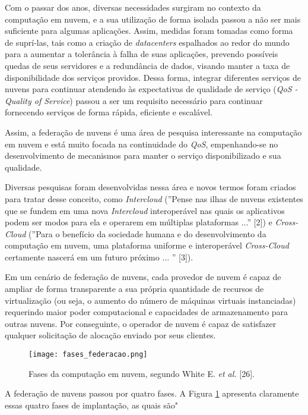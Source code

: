 Com o passar dos anos, diversas necessidades surgiram no contexto da computação em nuvem, e a sua utilização de forma isolada passou a não ser mais suficiente para algumas aplicações. Assim, medidas foram tomadas como forma de suprí-las, tais como a criação de \textit{datacenters} espalhados ao redor do mundo para a aumentar a tolerância à falha de suas aplicações, prevendo possíveis quedas de seus servidores e a redundância de dados, visando manter a taxa de disponibilidade dos serviços providos. Dessa forma, integrar diferentes serviços de nuvens para continuar atendendo às expectativas de qualidade de serviço (\textit{QoS - Quality of Service}) passou a ser um requisito necessário para continuar fornecendo serviços de forma rápida, eficiente e escalável. 

Assim, a federação de nuvens é uma área de pesquisa interessante na computação em nuvem e está muito focada na continuidade do \textit{QoS}, empenhando-se no desenvolvimento de mecanismos para manter o serviço disponibilizado e sua qualidade. 

Diversas pesquisas foram desenvolvidas nessa área e novos termos foram criados para tratar desse conceito, como \textit{Intercloud} (''Pense nas ilhas de nuvens existentes que se fundem em uma nova \textit{Intercloud} interoperável nas quais os aplicativos podem ser modos para ela e operarem em múltiplas plataformas ...'' [2]) e \textit{Cross-Cloud} (''Para o benefício da sociedade humana e do desenvolvimento da computação em nuvem, uma plataforma uniforme e interoperável \textit{Cross-Cloud} certamente nascerá em um futuro próximo ... '' [3]).

Em um cenário de federação de nuvens, cada provedor de nuvem é capaz de ampliar de forma transparente a sua própria quantidade de recursos de virtualização (ou seja, o aumento do número de máquinas virtuais instanciadas) requerindo maior poder computacional e capacidades de armazenamento para outras nuvens. Por conseguinte, o operador de nuvem é capaz de satisfazer qualquer solicitação de alocação enviado por seus clientes.

\begin{figure}[H]
	\centering
	\texttt{[image: fases\_federacao.png]}
	\caption{Fases da computação em nuvem, segundo White E. \textit{et al.} [26].}
	\label{fig:federacao_nuvens}
\end{figure}

A federação de nuvens passou por quatro fases. A Figura \ref{fig:federacao_nuvens} apresenta claramente essas quatro fases de implantação, as quais são"

